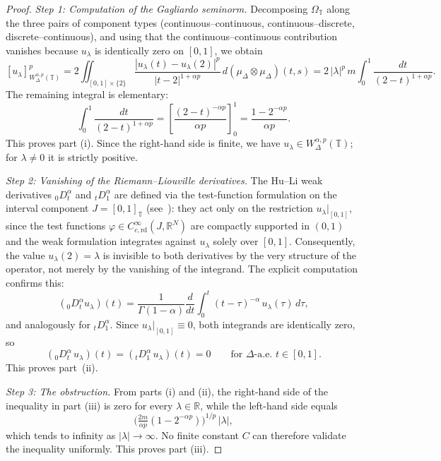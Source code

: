 \documentclass[11pt,a4paper]{article}
\numberwithin{equation}{section}
\theoremstyle{definition}
\newcommand{\R}{\mathbb{R}}
\newcommand{\T}{\mathbb{T}}
\begin{document}
\begin{proof}
\emph{Step 1: Computation of the Gagliardo seminorm.} Decomposing
$\Omega_\T$ along the three pairs of component types (continuous--continuous,
continuous--discrete, discrete--continuous), and using that the
continuous--continuous contribution vanishes because $u_\lambda$ is
identically zero on $[0,1]$, we obtain
\[
[u_\lambda]^p_{W^{\alpha,p}_\Delta(\T)}
= 2 \iint_{[0,1] \times \{2\}}
    \frac{|u_\lambda(t) - u_\lambda(2)|^p}{|t - 2|^{1+\alpha p}}
    \, d(\mu_\Delta \otimes \mu_\Delta)(t, s)
= 2 \, |\lambda|^p \, m \int_0^1 \frac{dt}{(2 - t)^{1+\alpha p}}.
\]
The remaining integral is elementary:
\[
\int_0^1 \frac{dt}{(2 - t)^{1+\alpha p}}
= \left[ \frac{(2 - t)^{-\alpha p}}{\alpha p} \right]_0^1
= \frac{1 - 2^{-\alpha p}}{\alpha p}.
\]
This proves part (i). Since the right-hand side is finite, we have
$u_\lambda \in W^{\alpha,p}_\Delta(\T)$; for $\lambda \neq 0$ it is
strictly positive.

\emph{Step 2: Vanishing of the Riemann--Liouville derivatives.}
The Hu--Li weak derivatives ${}_0D^\alpha_t$ and ${}_tD^\alpha_1$
are defined via the test-function formulation on the interval
component $J=[0,1]_\T$
(see~\cite{HuLi2022Right,HuLi2022Left}): they act only on the
restriction $u_\lambda|_{[0,1]}$, since the test functions
$\varphi\in C^\infty_{c,\mathrm{rd}}(J,\R^N)$ are compactly
supported in $(0,1)$ and the weak formulation integrates against
$u_\lambda$ solely over $[0,1]$. Consequently, the value
$u_\lambda(2)=\lambda$ is invisible to both derivatives by the
very structure of the operator, not merely by the vanishing of
the integrand. The explicit computation confirms this:
\[
({}_0 D^\alpha_t u_\lambda)(t)
= \frac{1}{\Gamma(1-\alpha)} \frac{d}{dt}
    \int_0^t (t - \tau)^{-\alpha} \, u_\lambda(\tau) \, d\tau,
\]
and analogously for ${}_tD^\alpha_1$. Since $u_\lambda|_{[0,1]}\equiv 0$,
both integrands are identically zero, so
\[
({}_0 D^\alpha_t \, u_\lambda)(t)
= ({}_t D^\alpha_1 \, u_\lambda)(t) = 0
\qquad\text{for $\Delta$-a.e.\ }t\in[0,1].
\]
This proves part~(ii).

\emph{Step 3: The obstruction.} From parts (i) and (ii), the right-hand
side of the inequality in part (iii) is zero for every $\lambda \in \R$,
while the left-hand side equals
\[
\bigl( \tfrac{2 m}{\alpha p}(1 - 2^{-\alpha p}) \bigr)^{1/p} \, |\lambda|,
\]
which tends to infinity as $|\lambda| \to \infty$. No finite constant
$C$ can therefore validate the inequality uniformly. This proves
part (iii).
\end{proof}
\end{document}
